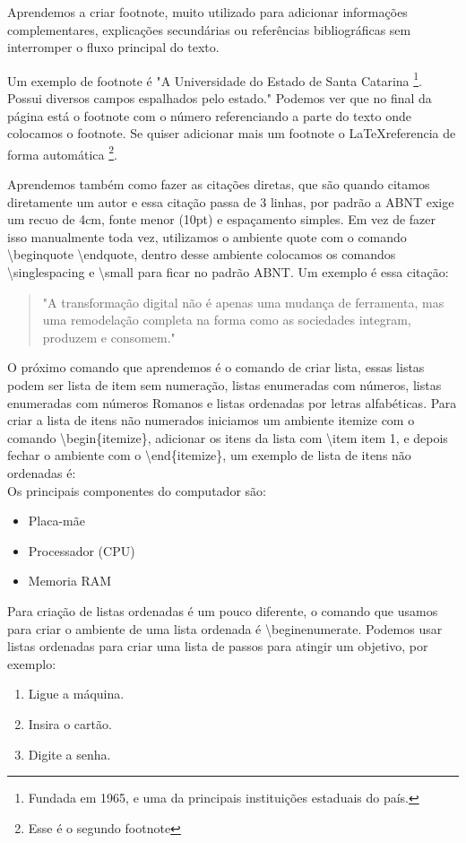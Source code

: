 Aprendemos a criar footnote, muito utilizado para adicionar informações complementares, explicações secundárias ou referências bibliográficas sem interromper o fluxo principal do texto.

Um exemplo de footnote é "A Universidade do Estado de Santa Catarina \footnote{Fundada em 1965, e uma da principais instituições estaduais do país.}. Possui diversos campos espalhados pelo estado." Podemos ver que no final da página está o footnote com o número referenciando a parte do texto onde colocamos o footnote. Se quiser adicionar mais um footnote o \LaTeX referencia de forma automática \footnote{Esse é o segundo footnote}.

Aprendemos também como fazer as citações diretas, que são quando citamos diretamente um autor e essa citação passa de 3 linhas, por padrão a ABNT exige um recuo de 4cm, fonte menor (10pt) e espaçamento simples. Em vez de fazer isso manualmente toda vez, utilizamos o ambiente quote com o comando \textbackslash begin{quote} \textbackslash end{quote}, dentro desse ambiente colocamos os comandos \textbackslash singlespacing e \textbackslash small para ficar no padrão ABNT. Um exemplo é essa citação:
\begin{quote}
    \small
    "A transformação digital não é apenas uma mudança de ferramenta, mas uma remodelação completa na forma como as sociedades integram, produzem e consomem."
\end{quote}


O próximo comando que aprendemos é o comando de criar lista, essas listas podem ser lista de item sem numeração, listas enumeradas com números, listas enumeradas com números Romanos e listas ordenadas por letras alfabéticas. Para criar a lista de itens não numerados iniciamos um ambiente itemize com o comando \textbackslash begin\{itemize\}, adicionar os itens da lista com \textbackslash item item 1, e depois fechar o ambiente com o  \textbackslash end\{itemize\}, um exemplo de lista de itens não ordenadas é:\\
Os principais componentes do computador são:
\begin{itemize}
    \item Placa-mãe
    \item Processador (CPU)
    \item Memoria RAM
\end{itemize}

Para criação de listas ordenadas é um pouco diferente, o comando que usamos para criar o ambiente de uma lista ordenada é \textbackslash begin{enumerate}. Podemos usar listas ordenadas para criar uma lista de passos para atingir um objetivo, por exemplo:
\begin{enumerate}
    \item Ligue a máquina.
    \item Insira o cartão.
    \item Digite a senha.
\end{enumerate}

